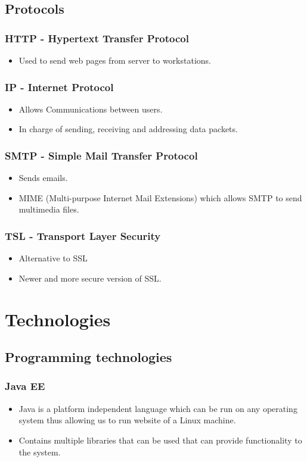 \documentclass[12pt, oneside]{article}
\begin{document}
	\subsection{Protocols}
		\subsubsection{HTTP - Hypertext Transfer Protocol}
			\begin{itemize}
				\item Used to send web pages from server to workstations.  
			\end{itemize}
		\subsubsection{IP - Internet Protocol}	
			\begin{itemize}
				\item Allows Communications between users.
				\item In charge of sending, receiving and addressing data packets.
			\end{itemize}				
		\subsubsection{SMTP - Simple Mail Transfer Protocol}
			\begin{itemize}
				\item Sends emails.
				\item MIME (Multi-purpose Internet Mail Extensions) which allows SMTP to send multimedia files.
			\end{itemize}
		\subsubsection{TSL - Transport Layer Security}
			\begin{itemize}
				\item Alternative to SSL
				\item Newer and more secure version of SSL.
			\end{itemize}

		
\section{Technologies}
	\subsection{Programming technologies}
		\subsubsection{Java EE}
			\begin{itemize}
				\item Java is a platform independent language which can be run on any operating system thus allowing us to run website of a Linux machine.
				\item Contains multiple libraries that can be used that can provide functionality to the system. 
			\end{itemize}
			
\end{document}
